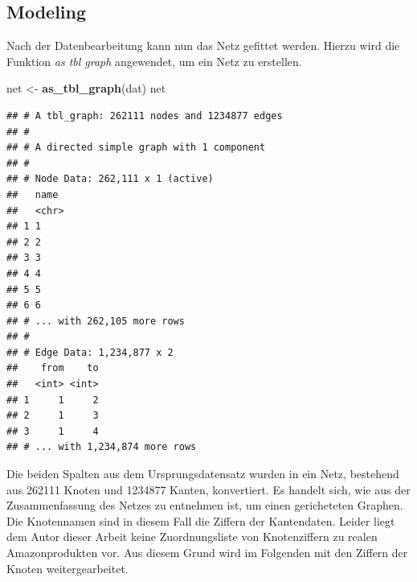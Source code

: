 \documentclass[
  12 pt,
]{article}
\newenvironment{Shaded}{\begin{snugshade}}{\end{snugshade}}
\newcommand{\DataTypeTok}[1]{\textcolor[rgb]{0.13,0.29,0.53}{#1}}
\newcommand{\DecValTok}[1]{\textcolor[rgb]{0.00,0.00,0.81}{#1}}
\newcommand{\KeywordTok}[1]{\textcolor[rgb]{0.13,0.29,0.53}{\textbf{#1}}}
\newcommand{\NormalTok}[1]{#1}
\newcommand{\OperatorTok}[1]{\textcolor[rgb]{0.81,0.36,0.00}{\textbf{#1}}}
\newcommand{\StringTok}[1]{\textcolor[rgb]{0.31,0.60,0.02}{#1}}
\begin{document}
\begin{Shaded}
\end{Shaded}

\hypertarget{modeling}{%
\subsection{Modeling}\label{modeling}}

Nach der Datenbearbeitung kann nun das Netz gefittet werden. Hierzu wird
die Funktion \textit{as tbl graph} angewendet, um ein Netz zu
erstellen.\\

\begin{Shaded}
\begin{Highlighting}[]
\NormalTok{net <-}\StringTok{ }\KeywordTok{as_tbl_graph}\NormalTok{(dat)}
\NormalTok{net}
\end{Highlighting}
\end{Shaded}

\begin{verbatim}
## # A tbl_graph: 262111 nodes and 1234877 edges
## #
## # A directed simple graph with 1 component
## #
## # Node Data: 262,111 x 1 (active)
##   name 
##   <chr>
## 1 1    
## 2 2    
## 3 3    
## 4 4    
## 5 5    
## 6 6    
## # ... with 262,105 more rows
## #
## # Edge Data: 1,234,877 x 2
##    from    to
##   <int> <int>
## 1     1     2
## 2     1     3
## 3     1     4
## # ... with 1,234,874 more rows
\end{verbatim}

Die beiden Spalten aus dem Ursprungsdatensatz wurden in ein Netz,
bestehend aus 262111 Knoten und 1234877 Kanten, konvertiert. Es handelt
sich, wie aus der Zusammenfassung des Netzes zu entnehmen ist, um einen
gericheteten Graphen. Die Knotennamen sind in diesem Fall die Ziffern
der Kantendaten. Leider liegt dem Autor dieser Arbeit keine
Zuordnungsliste von Knotenziffern zu realen Amazonprodukten vor. Aus
diesem Grund wird im Folgenden mit den Ziffern der Knoten
weitergearbeitet.\\
\end{document}
